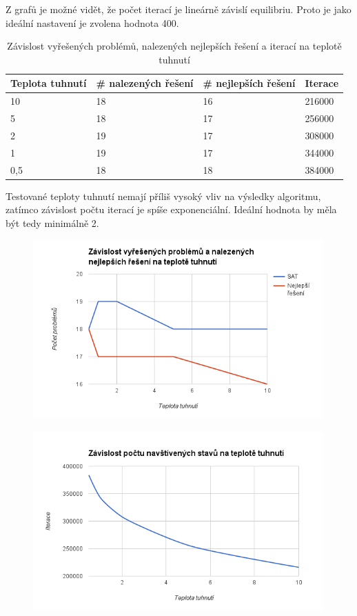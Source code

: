 \documentclass[10pt,a4paper]{article}
\begin{document}
Z grafů je možné vidět, že počet iterací je lineárně závislí equilibriu. Proto je jako ideální nastavení je zvolena hodnota 400.

\begin{table}[H]
\centering
  \begin{tabular}{ |l|l|l|l|}
  \hline
  Teplota tuhnutí & \# nalezených řešení & \# nejlepších řešení & Iterace\\
  \hline
    10  & 18 & 16 & 216000 \\
    5   & 18 & 17 & 256000 \\
    2   & 19 & 17 & 308000 \\
    1   & 19 & 17 & 344000 \\
    0,5 & 18 & 18 & 384000 \\
  \hline
  \end{tabular}
  \caption{Závislost vyřešených problémů, nalezených nejlepších řešení a iterací na teplotě tuhnutí}
\end{table}

Testované teploty tuhnutí nemají příliš vysoký vliv na výsledky algoritmu, zatímco závislost počtu iterací je spíše exponenciální. Ideální hodnota by měla být tedy minimálně 2.

\begin{figure}[H]\centering
 \includegraphics[width=0.99\textwidth]{8}
\end{figure}

\begin{figure}[H]\centering
 \includegraphics[width=0.99\textwidth]{9}
\end{figure}
\end{document}
